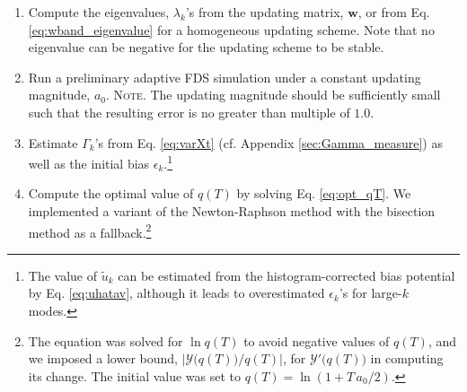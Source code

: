\documentclass[preprint, superscriptaddress, floatfix]{revtex4-1}
\newcommand{\note}[1]{{\color{DarkGreen}\footnotesize \textsc{Note.} #1}}
\begin{document}
\begin{enumerate}

\item
Compute the eigenvalues, $\lambda_k$'s
from the updating matrix, $\mathbf w$,
or from Eq. \eqref{eq:wband_eigenvalue}
for a homogeneous updating scheme.
%
Note that
no eigenvalue can be negative for the updating scheme to be stable.

\item \label{step:prerun}
Run a preliminary adaptive FDS simulation
under a constant updating magnitude, $a_0$.
%
\note{The updating magnitude should be sufficiently small
  such that the resulting error is no greater than
  multiple of $1.0$.}

\item \label{step:Gamma}
Estimate $\Gamma_k$'s from Eq. \eqref{eq:varXt}
(cf. Appendix \ref{sec:Gamma_measure})
as well as the initial bias $\epsilon_k$.\footnote{The
  value of $\tilde u_k$ can be estimated
  from the histogram-corrected bias potential
  by Eq. \eqref{eq:uhatav},
  although it leads to overestimated
  $\epsilon_k$'s for large-$k$ modes.
}

\item \label{step:qT}
Compute the optimal value of $q(T)$ by solving Eq. \eqref{eq:opt_qT}.
%
We implemented a variant of the Newton-Raphson method\cite{press3rd}
with the bisection method\cite{press3rd}
as a fallback.\footnote{
The equation was solved for $\ln q(T)$
to avoid negative values of $q(T)$,
and we imposed a lower bound,
$\bigl|\mathcal Y\bigl(q(T)\bigr)/q(T)\bigr|$, for
$\mathcal Y'\bigl(q(T)\bigr)$
in computing its change.
The initial value was set to $q(T) = \ln(1+T\,a_0/2)$.
}
%


\end{enumerate}
\end{document}
